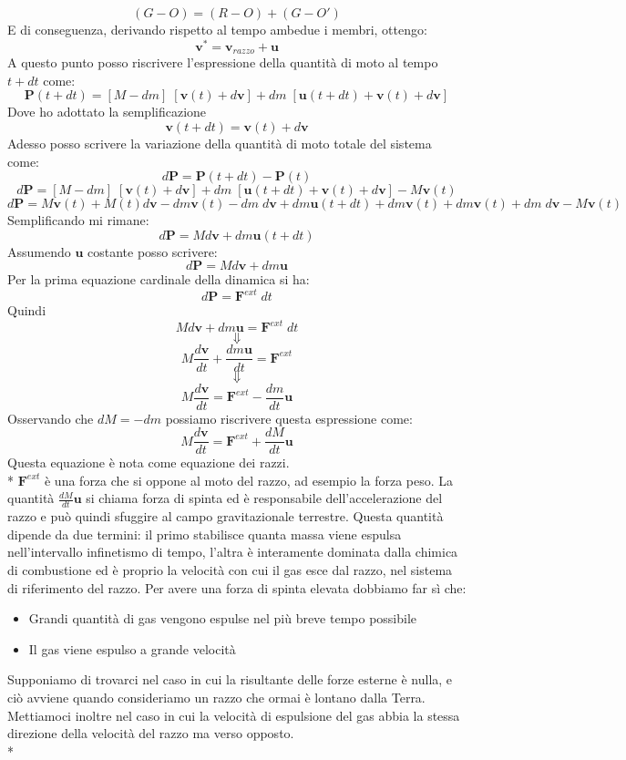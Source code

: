 \documentclass[10pt,a4paper]{book}
\begin{document}
$$
(G - O) = (R - O) + (G - O')
$$
E di conseguenza, derivando rispetto al tempo ambedue i membri, ottengo:
$$
\mathbf{v^*} = \mathbf{v}_{razzo} + \mathbf{u}
$$
A questo punto posso riscrivere l'espressione della quantità di moto al tempo $t + dt$ come:
$$
\mathbf{P}(t + dt) = [M - dm]\;[\mathbf{v}(t) + d\mathbf{v}] + dm\;[\mathbf{u}(t + dt) + \mathbf{v}(t) + d\mathbf{v}]
$$
Dove ho adottato la semplificazione
$$
\mathbf{v}(t + dt) = \mathbf{v}(t) + d\mathbf{v}
$$
Adesso posso scrivere la variazione della quantità di moto totale del sistema come:
$$
d\mathbf{P} = \mathbf{P}(t + dt) - \mathbf{P}(t)
$$
$$
d\mathbf{P} = [M - dm]\;[\mathbf{v}(t) + d\mathbf{v}] + dm\;[\mathbf{u}(t + dt) + \mathbf{v}(t) + d\mathbf{v}] - M\mathbf{v}(t)
$$
$$
d\mathbf{P} = M\mathbf{v}(t) + M(t)d\mathbf{v} - dm\mathbf{v}(t) - dm\;d\mathbf{v} + dm\mathbf{u}(t + dt) + dm\mathbf{v}(t) + dm\mathbf{v}(t) + dm\;d\mathbf{v} - M\mathbf{v}(t)
$$
Semplificando mi rimane:
$$
d\mathbf{P} = Md\mathbf{v} + dm\mathbf{u}(t + dt)
$$
Assumendo $\mathbf{u}$ costante posso scrivere:
$$
d\mathbf{P} = Md\mathbf{v} + dm\mathbf{u}
$$
Per la prima equazione cardinale della dinamica si ha:
$$
d\mathbf{P} = \mathbf{F}^{ext}\;dt
$$
Quindi
$$
Md\mathbf{v} + dm\mathbf{u} = \mathbf{F}^{ext}\;dt
$$
$$
\Downarrow
$$
$$
M\frac{d\mathbf{v}}{dt}+ \frac{dm\mathbf{u}}{dt} = \mathbf{F}^{ext}
$$
$$
\Downarrow
$$
$$
M\frac{d\mathbf{v}}{dt} = \mathbf{F}^{ext} - \frac{dm}{dt}\mathbf{u}
$$
Osservando che $dM = - dm$ possiamo riscrivere questa espressione come:
$$
M\frac{d\mathbf{v}}{dt} = \mathbf{F}^{ext} + \frac{dM}{dt}\mathbf{u}
$$
Questa equazione è nota come equazione dei razzi.\\*
$\mathbf{F}^{ext}$ è una forza che si oppone al moto del razzo, ad esempio la forza peso. La quantità $\frac{dM}{dt} \mathbf{u}$ si chiama forza di spinta ed è responsabile dell'accelerazione del razzo e può quindi sfuggire al campo gravitazionale terrestre. Questa quantità dipende da due termini: il primo stabilisce quanta massa viene espulsa nell'intervallo infinetismo di tempo, l'altra è interamente dominata dalla chimica di combustione ed è proprio la velocità con cui il gas esce dal razzo, nel sistema di riferimento del razzo. Per avere una forza di spinta elevata dobbiamo far sì che:
\begin{itemize}
	\item Grandi quantità di gas vengono espulse nel più breve tempo possibile
	\item Il gas viene espulso a grande velocità
\end{itemize}
Supponiamo di trovarci nel caso in cui la risultante delle forze esterne è nulla, e ciò avviene quando consideriamo un razzo che ormai è lontano dalla Terra. Mettiamoci inoltre nel caso in cui la velocità di espulsione del gas abbia la stessa direzione della velocità del razzo ma verso opposto.\\*
\end{document}
